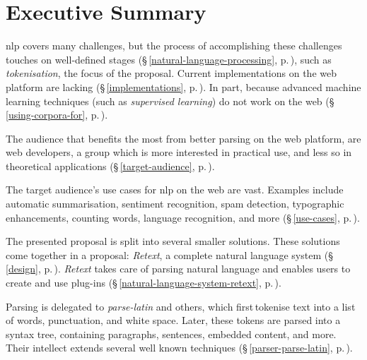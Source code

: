 
\begingroup
\let\clearpage\relax
\let\cleardoublepage\relax
\let\cleardoublepage\relax

\chapter*{Executive Summary}

\gls{nlp} covers many challenges, but the process of accomplishing
  these challenges touches on well-defined stages
  (§\,\ref{natural-language-processing},
  p.\,\pageref{natural-language-processing}), such as \emph{tokenisation},
  the focus of the proposal.
Current implementations on the web platform are lacking
  (§\,\ref{implementations}, p.\,\pageref{implementations}).
In part, because advanced machine learning techniques (such as
  \emph{supervised learning}) do not work on the web
  (§\,\ref{using-corpora-for}, p.\,\pageref{using-corpora-for}).

The audience that benefits the most from better parsing on the web platform,
  are web developers, a group which is more interested in practical use, and
  less so in theoretical applications
  (§\,\ref{target-audience}, p.\,\pageref{target-audience}).

The target audience's use cases for \gls{nlp} on the web are vast.
Examples include automatic summarisation, sentiment recognition, spam
  detection, typographic enhancements, counting words, language recognition,
  and more (§\,\ref{use-cases}, p.\,\pageref{use-cases}).

The presented proposal is split into several smaller solutions.
These solutions come together in a proposal: \emph{Retext}, a complete
  natural language system (§\,\ref{design}, p.\,\pageref{design}).
\emph{Retext} takes care of parsing natural language and enables users to
  create and use plug-ins (§\,\ref{natural-language-system-retext},
  p.\,\pageref{natural-language-system-retext}).

Parsing is delegated to \emph{parse-latin} and others, which first\,tokenise
  text into a list of words, punctuation, and white space.
Later, these tokens are parsed into a syntax tree, containing paragraphs,
  sentences, embedded content, and more. Their intellect extends several well
  known techniques (§\,\ref{parser-parse-latin},
  p.\,\pageref{parser-parse-latin}).

